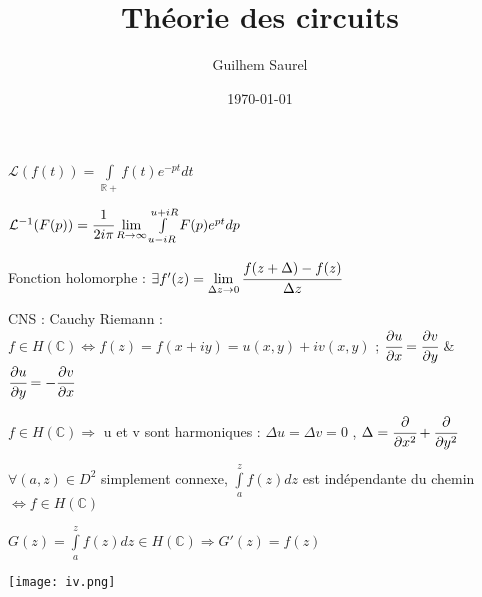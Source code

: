 \documentclass[10pt,a4paper]{article}
\title{Théorie des circuits}
\date{\today}
\author{Guilhem Saurel}
\begin{document}

$\mathcal{L}(f(t)) = \int \limits_{\mathbb{R}+} { f(t) e^{-pt} dt}$

$\mathcal{L}^{-1}(F(p)) = \cfrac{1}{2i\pi} \lim \limits_{R \to \infty} \int \limits_{u-iR}^{u+iR} {F(p)e^{pt}dp}$

Fonction holomorphe : $\exists f'(z) = \lim \limits_{\Delta z \to 0} \cfrac { f(z+ \Delta ) - f(z)}{\Delta z}$

CNS : Cauchy Riemann : $f \in H(\mathbb{C}) \Leftrightarrow f(z) = f(x+iy) = u(x,y) +iv(x,y)$ ; $\cfrac{\partial u}{\partial x} = \cfrac{\partial v}{\partial y}$ \& $\cfrac{\partial u}{\partial y} = - \cfrac{\partial v}{\partial x}$ 

$f \in H(\mathbb{C}) \Rightarrow $ u et v sont harmoniques : $\Delta u = \Delta v = 0$ , $\Delta = \cfrac{\partial}{\partial x^2} + \cfrac{\partial}{\partial y^2}$

$\forall (a,z) \in D^2$ simplement connexe, $\int \limits_a^z f(z) dz$ est indépendante du chemin $\Leftrightarrow f \in H(\mathbb{C})$

$G(z) = \int \limits_a^z f(z) dz \in H(\mathbb{C}) \Rightarrow G'(z) = f(z)$

\texttt{[image: iv.png]}
\end{document}
